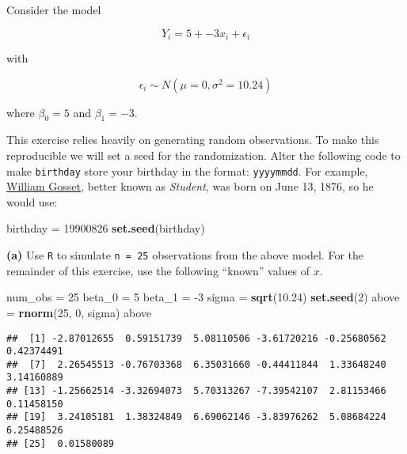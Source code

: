 \documentclass[]{article}
\newenvironment{Shaded}{\begin{snugshade}}{\end{snugshade}}
\newcommand{\DecValTok}[1]{\textcolor[rgb]{0.00,0.00,0.81}{#1}}
\newcommand{\FloatTok}[1]{\textcolor[rgb]{0.00,0.00,0.81}{#1}}
\newcommand{\KeywordTok}[1]{\textcolor[rgb]{0.13,0.29,0.53}{\textbf{#1}}}
\newcommand{\NormalTok}[1]{#1}
\newcommand{\StringTok}[1]{\textcolor[rgb]{0.31,0.60,0.02}{#1}}
\begin{document}
Consider the model

\[
Y_i = 5 + -3 x_i + \epsilon_i
\]

with

\[
\epsilon_i \sim N(\mu = 0, \sigma^2 = 10.24)
\]

where \(\beta_0 = 5\) and \(\beta_1 = -3\).

This exercise relies heavily on generating random observations. To make
this reproducible we will set a seed for the randomization. Alter the
following code to make \texttt{birthday} store your birthday in the
format: \texttt{yyyymmdd}. For example,
\href{https://en.wikipedia.org/wiki/William_Sealy_Gosset}{William
Gosset}, better known as \emph{Student}, was born on June 13, 1876, so
he would use:

\begin{Shaded}
\begin{Highlighting}[]
\NormalTok{birthday =}\StringTok{ }\DecValTok{19900826}
\KeywordTok{set.seed}\NormalTok{(birthday)}
\end{Highlighting}
\end{Shaded}

\textbf{(a)} Use \texttt{R} to simulate \texttt{n\ =\ 25} observations
from the above model. For the remainder of this exercise, use the
following ``known'' values of \(x\).

\begin{Shaded}
\begin{Highlighting}[]
\NormalTok{num_obs =}\StringTok{ }\DecValTok{25}
\NormalTok{beta_}\DecValTok{0}\NormalTok{ =}\StringTok{ }\DecValTok{5}
\NormalTok{beta_}\DecValTok{1}\NormalTok{ =}\StringTok{ }\DecValTok{-3}
\NormalTok{sigma =}\StringTok{ }\KeywordTok{sqrt}\NormalTok{(}\FloatTok{10.24}\NormalTok{)}
\KeywordTok{set.seed}\NormalTok{(}\DecValTok{2}\NormalTok{)}
\NormalTok{above =}\StringTok{ }\KeywordTok{rnorm}\NormalTok{(}\DecValTok{25}\NormalTok{, }\DecValTok{0}\NormalTok{, sigma)}
\NormalTok{above}
\end{Highlighting}
\end{Shaded}

\begin{verbatim}
##  [1] -2.87012655  0.59151739  5.08110506 -3.61720216 -0.25680562  0.42374491
##  [7]  2.26545513 -0.76703368  6.35031660 -0.44411844  1.33648240  3.14160889
## [13] -1.25662514 -3.32694073  5.70313267 -7.39542107  2.81153466  0.11458150
## [19]  3.24105181  1.38324849  6.69062146 -3.83976262  5.08684224  6.25488526
## [25]  0.01580089
\end{verbatim}
\end{document}
